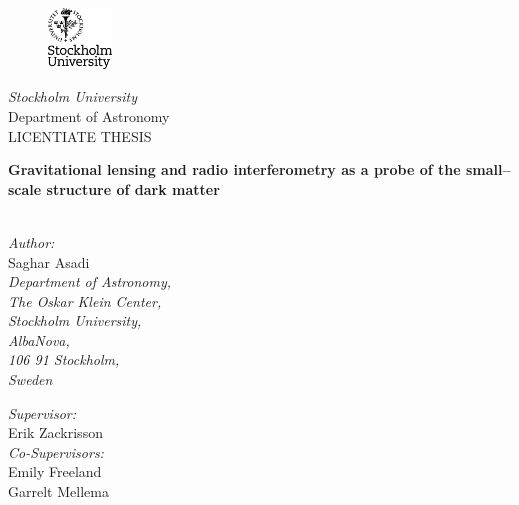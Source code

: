 \documentclass[a4wide,12pt]{book}
\begin{document}
\titlepage
\begin{center}

\begin{figure}[!h]
\vspace{-1.5cm}
\includegraphics[width=0.15\textwidth]{SU-Logga.eps}
\end{figure}
\textit{\Large{Stockholm University}}\\

\Large{Department of Astronomy}\\

\vspace{1.5cm}
\large{LICENTIATE THESIS}\\

\vspace{0.1cm}

{\bf \LARGE{Gravitational lensing and radio interferometry as a probe of the small--scale structure of dark matter\\ \vspace{1.4cm} }}~\\
\end{center}

\vspace{-1.0cm}
\begin{center}
\large{{\it Author:}\\ Saghar Asadi}\\
\vspace{0.5cm}
\small{\it Department of Astronomy,\\ The Oskar Klein Center,\\ Stockholm University,\\ AlbaNova,\\ 106 91 Stockholm,\\ Sweden}

\vspace{1.0cm}
\large{{\it Supervisor:}\\ Erik Zackrisson}\\
\vspace{0.5cm}
\large{{\it Co-Supervisors:}\\ Emily Freeland\\ Garrelt Mellema}\\
\vspace{0.5cm}
\end{center}
\end{document}
